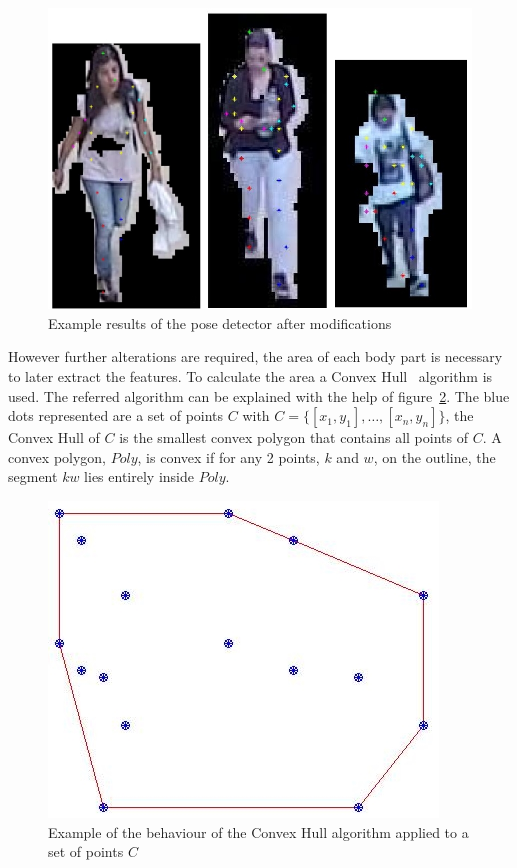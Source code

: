 \documentclass[titlepage,12pt,a4paper,times]{book}
\begin{document}
\begin{figure}[!h]
\centering
\includegraphics[scale=0.63]{images/3_3_fig2.jpg}
\caption{Example results of the pose detector after modifications}
\label{fig:erpdm}
\end{figure}
\FloatBarrier

However further alterations are required, the area of each body part is
necessary to later extract the features. To calculate the area a Convex
Hull~\citep{17,18} algorithm is used. The referred algorithm can be explained
with the help of figure~\ref{fig:ch}. The blue dots represented are a set of
points $C$ with $C = \{[x_1,y_1],\hdots,[x_n,y_n]\}$, the Convex
Hull of $C$ is the smallest convex polygon that contains all points of $C$. A
convex polygon, $Poly$, is convex if for any 2 points, $k$ and $w$, on the
outline, the segment $kw$ lies entirely inside $Poly$.

\begin{figure}[!h]
\centering
\includegraphics[scale=0.5]{images/3_3_fig5.jpg}
\caption{Example of the behaviour of the Convex Hull algorithm applied to a set
of points $C$}
\label{fig:ch}
\end{figure}
\FloatBarrier
\end{document}
